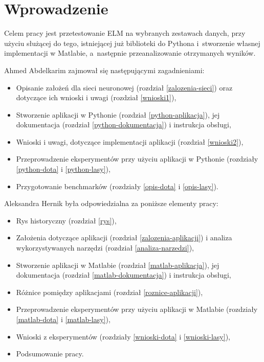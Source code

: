 \documentclass[pl]{minipw} %
\begin{document}
\sloppy


\tableofcontents


\cleardoublepage
\pagestyle{fancy}

\chapter*{Wprowadzenie}
Celem pracy jest przetestowanie ELM na wybranych zestawach danych, przy użyciu służącej do tego, istniejącej już biblioteki do Pythona i~stworzenie własnej implementacji w Matlabie, a~następnie przeanalizowanie otrzymanych wyników.

Ahmed Abdelkarim zajmował się następującymi zagadnieniami:
\begin{itemize}
\item Opisanie założeń dla sieci neuronowej (rozdział \ref{zalozenia-sieci}) oraz dotyczące ich wnioski i uwagi (rozdział \ref{wnioski1}),
\item Stworzenie aplikacji w Pythonie (rozdział \ref{python-aplikacja}), jej dokumentacja (rozdział \ref{python-dokumentacja}) i instrukcja obsługi,
\item Wnioski i uwagi, dotyczące implementacji aplikacji (rozdział \ref{wnioski2}),
\item Przeprowadzenie eksperymentów przy użyciu aplikacji w Pythonie (rozdziały \ref{python-dota} i \ref{python-lasy}),
\item Przygotowanie benchmarków (rozdziały \ref{opis-dota} i \ref{opis-lasy}).
\end{itemize}
Aleksandra Hernik była odpowiedzialna za poniższe elementy pracy:
\begin{itemize}
\item Rys historyczny (rozdział \ref{rys}),
\item Założenia dotyczące aplikacji (rozdział \ref{zalozenia-aplikacji}) i analiza wykorzystywanych narzędzi (rozdział \ref{analiza-narzedzi}),
\item Stworzenie aplikacji w Matlabie (rozdział \ref{matlab-aplikacja}), jej dokumentacja (rozdział \ref{matlab-dokumentacja}) i instrukcja obsługi,
\item Różnice pomiędzy aplikacjami (rozdział \ref{roznice-aplikacji}),
\item Przeprowadzenie eksperymentów przy użyciu aplikacji w Matlabie (rozdziały \ref{matlab-dota} i \ref{matlab-lasy}),
\item Wnioski z eksperymentów (rozdziały \ref{wnioski-dota} i \ref{wnioski-lasy}),
\item Podsumowanie pracy.
\end{itemize}
\clearpage
\end{document}
